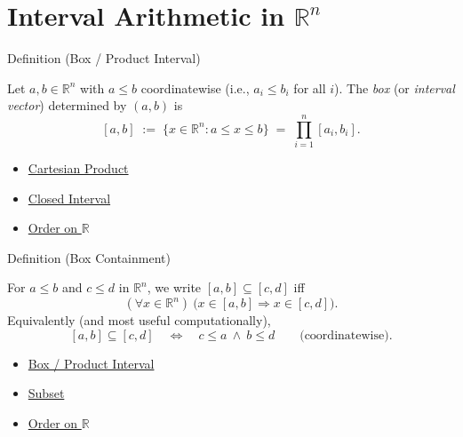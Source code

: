 
\section{\texorpdfstring{Interval Arithmetic in $\mathbb{R}^n$}{Interval Arithmetic in R n}}
\label{sec:interval-arithmetic-rn}

\begin{definitionbox}{Definition (Box / Product Interval)}
\begin{definition}\label{def:box}
Let $a,b\in\mathbb{R}^n$ with $a\le b$ coordinatewise (i.e., $a_i\le b_i$ for all $i$).
The \emph{box} (or \emph{interval vector}) determined by $(a,b)$ is
\[
[a,b] \;:=\; \{x\in\mathbb{R}^n : a\le x \le b\}
\;=\;\prod_{i=1}^n [a_i,b_i].
\]
\end{definition}
\end{definitionbox}

\begin{dependencies}
\begin{itemize}
  \item \hyperref[def:cartesian-product]{Cartesian Product}
  \item \hyperref[def:closed-interval]{Closed Interval}
  \item \hyperref[def:order-on-r]{Order on $\mathbb{R}$}
\end{itemize}
\end{dependencies}

\begin{definitionbox}{Definition (Box Containment)}
\begin{definition}\label{def:box-contain}
For $a\le b$ and $c\le d$ in $\mathbb{R}^n$, we write $[a,b]\subseteq[c,d]$ iff
\[
(\forall x\in\mathbb{R}^n)\ \bigl(x\in[a,b]\Rightarrow x\in[c,d]\bigr).
\]
Equivalently (and most useful computationally),
\[
[a,b]\subseteq[c,d]\quad \Longleftrightarrow\quad c\le a\ \land\ b\le d
\qquad\text{(coordinatewise).}
\]
\end{definition}
\end{definitionbox}

\begin{dependencies}
\begin{itemize}
  \item \hyperref[def:box]{Box / Product Interval}
  \item \hyperref[def:subset]{Subset}
  \item \hyperref[def:order-on-r]{Order on $\mathbb{R}$}
\end{itemize}
\end{dependencies}

